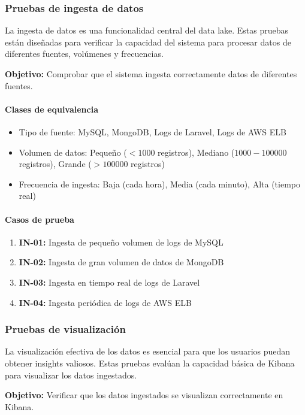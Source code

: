 \subsubsection{Pruebas de ingesta de datos}
La ingesta de datos es una funcionalidad central del data lake. Estas pruebas
están diseñadas para verificar la capacidad del sistema para procesar datos de
diferentes fuentes, volúmenes y frecuencias.

\textbf{Objetivo:} Comprobar que el sistema ingesta correctamente datos de
diferentes fuentes.

\paragraph{Clases de equivalencia}
\begin{itemize}
    \item Tipo de fuente: MySQL, MongoDB, Logs de Laravel, Logs de AWS ELB
    \item Volumen de datos: Pequeño ($<1000$ registros), Mediano ($1000-100000$
    	registros), Grande ($>100000$ registros)
    \item Frecuencia de ingesta: Baja (cada hora), Media (cada minuto), Alta
    	(tiempo real)
\end{itemize}

\paragraph{Casos de prueba}
\begin{enumerate}
    \item \textbf{IN-01:} Ingesta de pequeño volumen de logs de MySQL
    \item \textbf{IN-02:} Ingesta de gran volumen de datos de MongoDB
    \item \textbf{IN-03:} Ingesta en tiempo real de logs de Laravel
    \item \textbf{IN-04:} Ingesta periódica de logs de AWS ELB
\end{enumerate}


\newpage{}
\subsubsection{Pruebas de visualización}
La visualización efectiva de los datos es esencial para que los usuarios
puedan obtener insights valiosos. Estas pruebas evalúan la capacidad básica
de Kibana para visualizar los datos ingestados.

\textbf{Objetivo:} Verificar que los datos ingestados se visualizan
correctamente en Kibana.

